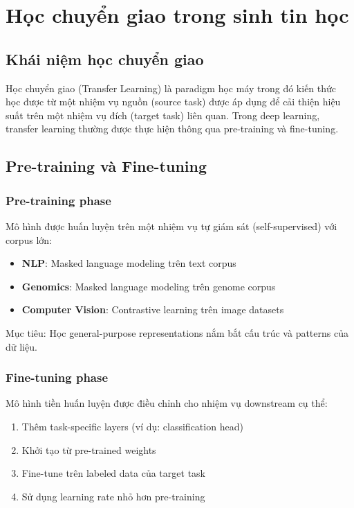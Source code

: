 \section{Học chuyển giao trong sinh tin học}
\label{sec:transfer_learning}

\subsection{Khái niệm học chuyển giao}

Học chuyển giao (Transfer Learning) là paradigm học máy trong đó kiến thức học được từ một nhiệm vụ nguồn (source task) được áp dụng để cải thiện hiệu suất trên một nhiệm vụ đích (target task) liên quan. Trong deep learning, transfer learning thường được thực hiện thông qua pre-training và fine-tuning.

\subsection{Pre-training và Fine-tuning}

\subsubsection{Pre-training phase}

Mô hình được huấn luyện trên một nhiệm vụ tự giám sát (self-supervised) với corpus lớn:
\begin{itemize}
    \item \textbf{NLP}: Masked language modeling trên text corpus
    \item \textbf{Genomics}: Masked language modeling trên genome corpus
    \item \textbf{Computer Vision}: Contrastive learning trên image datasets
\end{itemize}

Mục tiêu: Học general-purpose representations nắm bắt cấu trúc và patterns của dữ liệu.

\subsubsection{Fine-tuning phase}

Mô hình tiền huấn luyện được điều chỉnh cho nhiệm vụ downstream cụ thể:

\begin{enumerate}
    \item Thêm task-specific layers (ví dụ: classification head)
    \item Khởi tạo từ pre-trained weights
    \item Fine-tune trên labeled data của target task
    \item Sử dụng learning rate nhỏ hơn pre-training
\end{enumerate}

